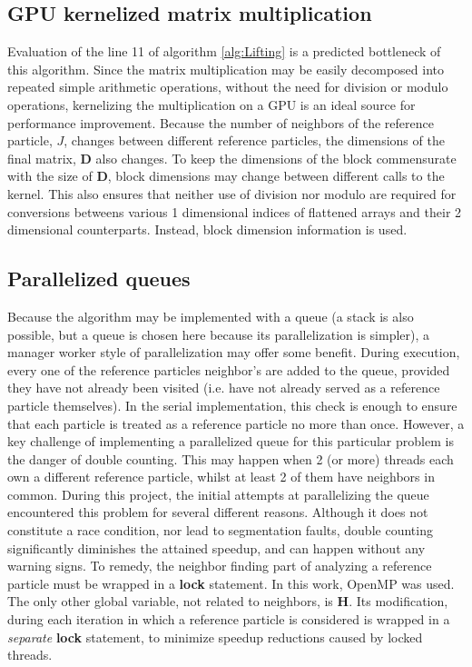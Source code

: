 \documentclass{article}
\begin{document}
\subsection{GPU kernelized matrix multiplication}
Evaluation of the line 11 of algorithm \ref{alg:Lifting} is a predicted bottleneck of this algorithm. Since the matrix multiplication may be easily decomposed into repeated simple arithmetic operations, without the need for division or modulo operations, kernelizing the multiplication on a GPU is an ideal source for performance improvement. Because the number of neighbors of the reference particle, $J$, changes between different reference particles, the dimensions of the final matrix, $\mathbf{D}$ also changes. To keep the dimensions of the block commensurate with the size of $\mathbf{D}$, block dimensions may change between different calls to the kernel. This also ensures that neither use of division nor modulo are required for conversions betweens various 1 dimensional indices of flattened arrays and their 2 dimensional counterparts. Instead, block dimension information is used. 

\subsection{Parallelized queues}
Because the algorithm may be implemented with a queue (a stack is also possible, but a queue is chosen here because its parallelization is simpler), a manager worker style of parallelization may offer some benefit. During execution, every one of the reference particles neighbor's are added to the queue, provided they have not already been visited (i.e. have not already served as a reference particle themselves). In the serial implementation, this check is enough to ensure that each particle is treated as a reference particle no more than once. However, a key challenge of implementing a parallelized queue for this particular problem is the danger of double counting. This may happen when 2 (or more) threads each own a different reference particle, whilst at least 2 of them have neighbors in common. During this project, the initial attempts at parallelizing the queue encountered this problem for several different reasons. Although it does not constitute a race condition, nor lead to segmentation faults, double counting significantly diminishes the attained speedup, and can happen without any warning signs. To remedy, the neighbor finding part of analyzing a reference particle must be wrapped in a \textbf{lock} statement. In this work, OpenMP was used. The only other global variable, not related to neighbors, is $\mathbf{H}$. Its modification, during each iteration in which a reference particle is considered is wrapped in a \textit{separate} \textbf{lock} statement, to minimize speedup reductions caused by locked threads.
\end{document}
